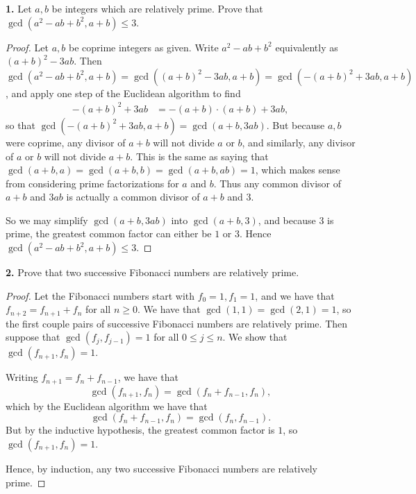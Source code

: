 \documentclass[11pt]{article}
\begin{document}
\textbf{1.} Let $a,b$ be integers which are relatively prime. Prove that $\gcd(a^2-ab+b^2, a+b)\leq 3$.
\begin{proof}
    Let $a,b$ be coprime integers as given. Write $a^2-ab+b^2$ equivalently as $(a+b)^2 - 3ab$. Then $\gcd(a^2-ab+b^2, a+b) = \gcd((a+b)^2 - 3ab, a+b) = \gcd(-(a+b)^2 + 3ab, a+b)$, and apply one step of the Euclidean algorithm to find
    \begin{align*}
        -(a+b)^2 + 3ab &= -(a+b)\cdot (a+b) + 3ab,
    \end{align*}
    so that $\gcd(-(a+b)^2 + 3ab, a+b) = \gcd(a+b,3ab)$. But because $a,b$ were coprime, any divisor of $a+b$ will not divide $a$ or $b$, and similarly, any divisor of $a$ or $b$ will not divide $a+b$. This is the same as saying that $\gcd(a+b, a) = \gcd(a+b,b) = \gcd(a+b,ab) = 1$, which makes sense from considering prime factorizations for $a$ and $b$. Thus any common divisor of $a+b$ and $3ab$ is actually a common divisor of $a+b$ and $3$.

    So we may simplify $\gcd(a+b,3ab)$ into $\gcd(a+b,3)$, and because $3$ is prime, the greatest common factor can either be $1$ or $3$. Hence $\gcd(a^2-ab+b^2, a+b)\leq 3$.
\end{proof}
\textbf{2.} Prove that two successive Fibonacci numbers are relatively prime.
\begin{proof}
    Let the Fibonacci numbers start with $f_0 = 1, f_1 = 1$, and we have that $f_{n+2} = f_{n+1} + f_n$ for all $n\geq 0$. We have that $\gcd(1,1) = \gcd(2,1) = 1$, so the first couple pairs of successive Fibonacci numbers are relatively prime. Then suppose that $\gcd(f_j, f_{j-1}) = 1$ for all $0\leq j \leq n$. We show that $\gcd(f_{n+1}, f_n) = 1$.

    Writing $f_{n+1} = f_n + f_{n-1}$, we have that \[\gcd(f_{n+1}, f_n) = \gcd(f_n + f_{n-1}, f_n),\] which by the Euclidean algorithm we have that \[\gcd(f_n + f_{n-1}, f_n) = \gcd(f_n, f_{n-1}).\] But by the inductive hypothesis, the greatest common factor is $1$, so $\gcd(f_{n+1}, f_n) = 1$.

    Hence, by induction, any two successive Fibonacci numbers are relatively prime.
\end{proof}
\end{document}
